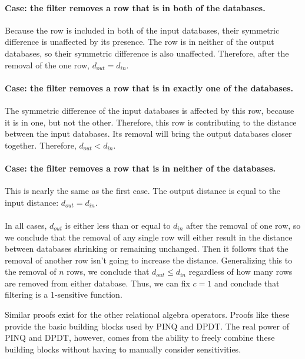 \documentclass[12pt]{article}
\begin{document}
\paragraph{Case: the filter removes a row that is in both of the databases.}
Because the row is included in both of the input databases, their symmetric difference is unaffected by its presence.
The row is in neither of the output databases, so their symmetric difference is also unaffected.
Therefore, after the removal of the one row, $d_{out} = d_{in}$.

\paragraph{Case: the filter removes a row that is in exactly one of the databases.}
The symmetric difference of the input databases is affected by this row, because it is in one, but not the other.
Therefore, this row is contributing to the distance between the input databases.
Its removal will bring the output databases closer together.
Therefore, $d_{out} < d_{in}$.

\paragraph{Case: the filter removes a row that is in neither of the databases.}
This is nearly the same as the first case.
The output distance is equal to the input distance: $d_{out} = d_{in}$.

\paragraph{} %
In all cases, $d_{out}$ is either less than or equal to $d_{in}$ after the removal of one row, so we conclude that the removal of any single row will either result in the distance between databases shrinking or remaining unchanged.
Then it follows that the removal of another row isn't going to increase the distance.
Generalizing this to the removal of $n$ rows, we conclude that $d_{out} \le d_{in}$ regardless of how many rows are removed from either database.
Thus, we can fix $c=1$ and conclude that filtering is a 1-sensitive function.

Similar proofs exist for the other relational algebra operators.
Proofs like these provide the basic building blocks used by PINQ and DPDT.
The real power of PINQ and DPDT, however, comes from the ability to freely combine these building blocks without having to manually consider sensitivities.
\end{document}
